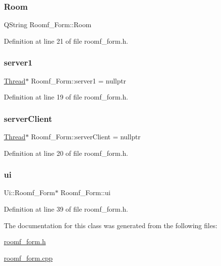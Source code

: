 \subsubsection{\texorpdfstring{Room}{Room}}
{\footnotesize\ttfamily Q\+String Roomf\+\_\+\+Form\+::\+Room}



Definition at line 21 of file roomf\+\_\+form.\+h.

\mbox{\label{class_roomf___form_a45dc0c008f3a55cef83302046c1ece47}} 
\subsubsection{\texorpdfstring{server1}{server1}}
{\footnotesize\ttfamily \mbox{\hyperlink{class_thread}{Thread}}$\ast$ Roomf\+\_\+\+Form\+::server1 = nullptr}



Definition at line 19 of file roomf\+\_\+form.\+h.

\mbox{\label{class_roomf___form_aeec51e8ae8159d701ea689ace5c45f06}} 
\subsubsection{\texorpdfstring{server\+Client}{serverClient}}
{\footnotesize\ttfamily \mbox{\hyperlink{class_thread}{Thread}}$\ast$ Roomf\+\_\+\+Form\+::server\+Client = nullptr}



Definition at line 20 of file roomf\+\_\+form.\+h.

\mbox{\label{class_roomf___form_a331dfce4d8f047ad8e6dc320ed46fe62}} 
\subsubsection{\texorpdfstring{ui}{ui}}
{\footnotesize\ttfamily Ui\+::\+Roomf\+\_\+\+Form$\ast$ Roomf\+\_\+\+Form\+::ui\hspace{0.3cm}{\ttfamily [private]}}



Definition at line 39 of file roomf\+\_\+form.\+h.



The documentation for this class was generated from the following files\+:\begin{DoxyCompactItemize}
\item 
\mbox{\hyperlink{roomf__form_8h}{roomf\+\_\+form.\+h}}\item 
\mbox{\hyperlink{roomf__form_8cpp}{roomf\+\_\+form.\+cpp}}\end{DoxyCompactItemize}
